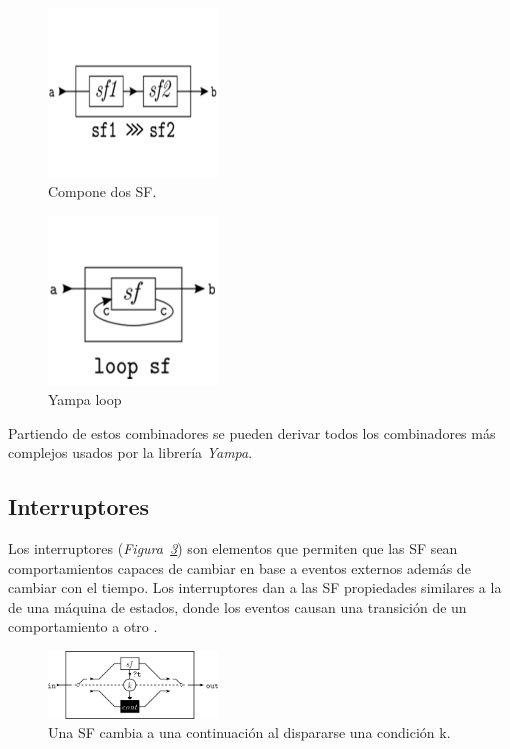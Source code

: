 \begin{figure}[htbp!]
\centering
\includegraphics[width=0.4\textwidth]{Yampa-composition}
\caption[Yampa-composition]{Compone dos SF.}
\label{fig:Yampa-composition}
\end{figure}

\begin{figure}[htbp!]
\centering
\includegraphics[width=0.4\textwidth]{Yampa-loop}
\caption[Yampa-loop]{Yampa loop}
\label{fig:Yampa-loop}
\end{figure}

Partiendo de estos combinadores se pueden derivar todos los combinadores más complejos usados por la librería \emph{Yampa}.

\subsection{Interruptores}

Los interruptores (\emph{Figura~\ref{fig:Yampa-switch}}) son elementos que permiten que las SF sean comportamientos capaces de cambiar en base a eventos externos además de cambiar con el tiempo. Los interruptores dan a las SF propiedades similares a la de una máquina de estados, donde los eventos causan una transición de un comportamiento a otro \cite{wiki:Yampa}.

\begin{figure}[htbp!]
\centering
\includegraphics[width=0.4\textwidth]{Yampa-switch}
\caption[Yampa-switch]{Una SF cambia a una continuación al dispararse una condición k.}
\label{fig:Yampa-switch}
\end{figure}

